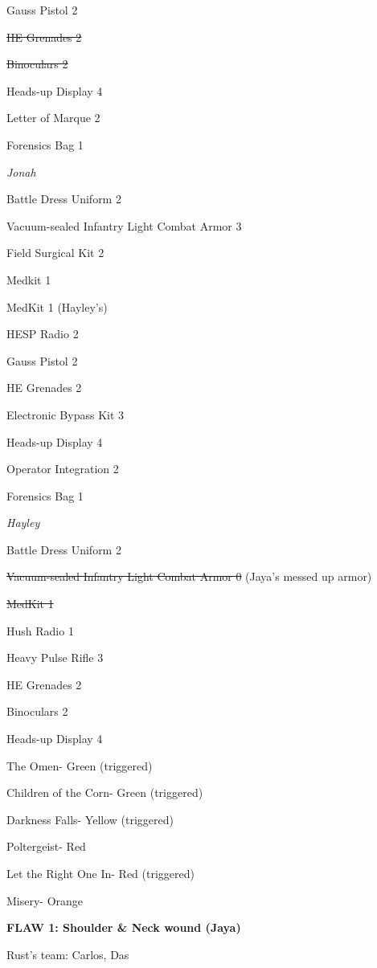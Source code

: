 Gauss Pistol 2

\sout{ HE Grenades 2 }

\sout{ Binoculars 2 }

Heads-up Display 4

Letter of Marque 2

Forensics Bag 1



\textit{Jonah}

Battle Dress Uniform 2

Vacuum-sealed Infantry Light Combat Armor 3

Field Surgical Kit 2

Medkit 1

MedKit 1 (Hayley's)

HESP Radio 2

Gauss Pistol 2

HE Grenades 2

Electronic Bypass Kit 3

Heads-up Display 4

Operator Integration 2

Forensics Bag 1



\textit{Hayley}

Battle Dress Uniform 2

\sout{ Vacuum-sealed Infantry Light Combat Armor 0 } (Jaya's messed up armor)

\sout{ MedKit 1 }

Hush Radio 1

Heavy Pulse Rifle 3

HE Grenades 2

Binoculars 2

Heads-up Display 4



The Omen- Green (triggered)

Children of the Corn- Green (triggered)

Darkness Falls- Yellow (triggered)

Poltergeist- Red

Let the Right One In- Red (triggered)

Misery- Orange



\textbf{ {\color[RGB]{255,0,0}FLAW 1: Shoulder \& Neck wound (Jaya)} }



Rust's team: Carlos, Das

